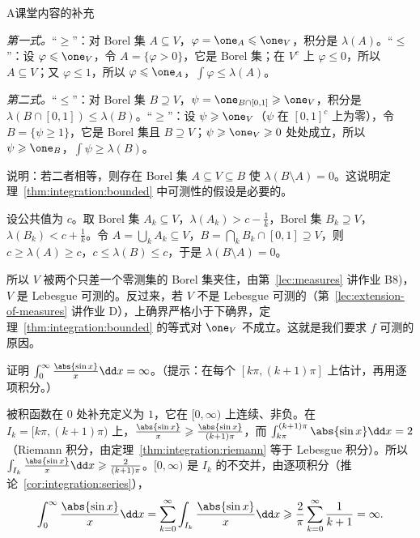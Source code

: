 \begin{exercises}{A}{课堂内容的补充}
\begin{questions}
\begin{solution}
\emph{第一式。}“$\geqslant$”：对 Borel 集 $A\subseteq V$，$\varphi=\one_A\leqslant\one_V$，积分是 $\lambda(A)$。“$\leqslant$”：设 $\varphi\leqslant\one_V$，令 $A=\{\varphi>0\}$，它是 Borel 集；在 $V^c$ 上 $\varphi\leqslant0$，所以 $A\subseteq V$；又 $\varphi\leqslant1$，所以 $\varphi\leqslant\one_A$，$\int\varphi\leqslant\lambda(A)$。

\emph{第二式。}“$\leqslant$”：对 Borel 集 $B\supseteq V$，$\psi=\one_{B\cap[0,1]}\geqslant\one_V$，积分是 $\lambda(B\cap[0,1])\leqslant\lambda(B)$。“$\geqslant$”：设 $\psi\geqslant\one_V$（$\psi$ 在 $[0,1]^c$ 上为零），令 $B=\{\psi\geqslant1\}$，它是 Borel 集且 $B\supseteq V$；$\psi\geqslant\one_V\geqslant0$ 处处成立，所以 $\psi\geqslant\one_B$，$\int\psi\geqslant\lambda(B)$。
\end{solution}
\item 说明：若二者相等，则存在 Borel 集 $A\subseteq V\subseteq B$ 使 $\lambda(B\setminus A)=0$。这说明定理~\ref{thm:integration:bounded} 中可测性的假设是必要的。
\begin{solution}
设公共值为 $c$。取 Borel 集 $A_k\subseteq V$，$\lambda(A_k)>c-\frac1k$，Borel 集 $B_k\supseteq V$，$\lambda(B_k)<c+\frac1k$。令 $A=\bigcup_kA_k\subseteq V$，$B=\bigcap_kB_k\cap[0,1]\supseteq V$，则 $c\geqslant\lambda(A)\geqslant c$，$c\leqslant\lambda(B)\leqslant c$，于是 $\lambda(B\setminus A)=0$。

所以 $V$ 被两个只差一个零测集的 Borel 集夹住，由第~\ref{lec:measures} 讲作业 B8)，$V$ 是 Lebesgue 可测的。反过来，若 $V$ 不是 Lebesgue 可测的（第~\ref{lec:extension-of-measures} 讲作业 D），上确界严格小于下确界，定理~\ref{thm:integration:bounded} 的等式对 $\one_V$ 不成立。这就是我们要求 $f$ 可测的原因。
\end{solution}
\end{questions}

\item\label{ex:integration:A9} 证明 $\int_0^\infty\frac{\abs{\sin x}}x\dd x=\infty$。（提示：在每个 $[k\pi,(k+1)\pi]$ 上估计，再用逐项积分。）
\begin{solution}
被积函数在 $0$ 处补充定义为 $1$，它在 $[0,\infty)$ 上连续、非负。在 $I_k=[k\pi,(k+1)\pi)$ 上，$\frac{\abs{\sin x}}x\geqslant\frac{\abs{\sin x}}{(k+1)\pi}$，而 $\int_{k\pi}^{(k+1)\pi}\abs{\sin x}\dd x=2$（Riemann 积分，由定理~\ref{thm:integration:riemann} 等于 Lebesgue 积分）。所以 $\int_{I_k}\frac{\abs{\sin x}}x\dd x\geqslant\frac2{(k+1)\pi}$。$[0,\infty)$ 是 $I_k$ 的不交并，由逐项积分（推论~\ref{cor:integration:series}），
\[
\int_0^\infty\frac{\abs{\sin x}}x\dd x=\sum_{k=0}^\infty\int_{I_k}\frac{\abs{\sin x}}x\dd x\geqslant\frac2\pi\sum_{k=0}^\infty\frac1{k+1}=\infty .
\]
\end{solution}


\end{exercises}

